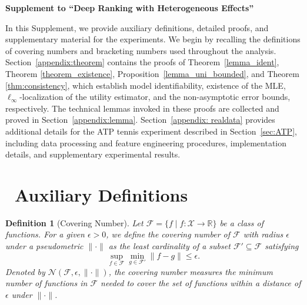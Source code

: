 \documentclass[
  12pt]{article}
\newtheorem{definition}{Definition}
\begin{document}

\def\spacingset#1{\renewcommand{\baselinestretch}%
{#1}\small\normalsize} \spacingset{1}



\spacingset{1.8} %




\label{supplementary-material}
\bigskip

\begin{center}

{\large\bf Supplement to ``Deep Ranking with Heterogeneous Effects''}

\end{center}



In this Supplement, we provide auxiliary definitions, detailed proofs, and supplementary material for the experiments. We begin by recalling the definitions of covering numbers and bracketing numbers used throughout the analysis. Section~\ref{appendix:theorem} contains the proofs of Theorem~\ref{lemma_ident}, Theorem \ref{theorem_existence}, Proposition~\ref{lemma_uni_bounded}, and Theorem \ref{thm:consistency}, which establish model identifiability, existence of the MLE, $\ell_\infty$-localization of the utility estimator, and the non-asymptotic error bounds, respectively. The technical lemmas invoked in these proofs are collected and proved in Section~\ref{appendix:lemma}. Section~\ref{appendix: realdata} provides additional details for the ATP tennis experiment described in Section~\ref{sec:ATP}, including data processing and feature engineering procedures, implementation details, and supplementary experimental results.

{
\hypersetup{linkcolor=black}
\tableofcontents
}


\section{~Auxiliary Definitions}\label{appendix: auxiliary}

\begin{definition}[Covering Number] 
Let $\mathcal{F}=\{f \mid f: \mathcal{X} \rightarrow \mathbb{R}\}$ be a class of functions. For a given $\epsilon>0$, we define the covering number of $\mathcal{F}$ with radius $\epsilon$ under a pseudometric $\|\cdot\|$ as the least cardinality of a subset $\mathcal{F}' \subseteq \mathcal{F}$ satisfying
$$\sup _{f \in \mathcal{F}} \min _{g \in \mathcal{F}'}\|f-g\| \leq \epsilon.$$
Denoted by $\mathcal{N}\left(\mathcal{F}, \epsilon,\|\cdot\|\right)$, the covering number measures the minimum number of functions in $\mathcal{F}$ needed to cover the set of functions within a distance of $\epsilon$ under $\|\cdot\|$.
\end{definition}
\end{document}
